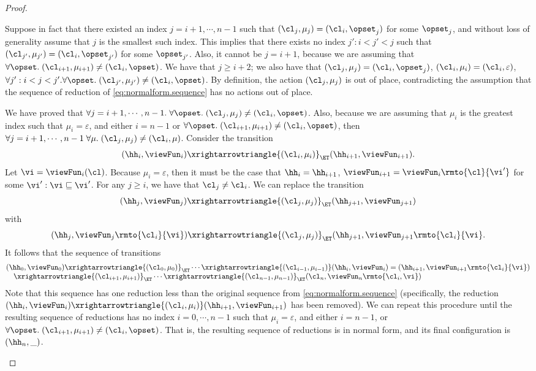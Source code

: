 \begin{proof}
\begin{enumerate}
Suppose in fact that there existed 
an index $j = i+1,\cdots, n-1$ such that $(\cl_{j}, \mu_{j}) = (\cl_{i}, \opset_{j})$ for some 
$\opset_{j}$, and without loss of generality assume that $j$ is the smallest such index. This implies that 
there exists no index $j': i < j' < j$ such that $(\cl_{j'}, \mu_{j'}) = (\cl_{i}, \opset_{j'})$ for some 
$\opset_{j'}$. Also, it cannot be $j = i+1$, because we are assuming that $\forall \opset.\;(\cl_{i+1}, \mu_{i+1}) \neq 
(\cl_{i}, \opset)$.  We have that $j \geq i+2$; we also have that  $(\cl_{j}, \mu_{j}) = (\cl_{i}, \opset_{j})$, 
$(\cl_{i}, \mu_{i}) = (\cl_{i}, \varepsilon)$, $\forall j': i < j < j'.\forall \opset.\; (\cl_{j'}, \mu_{j'}) \neq (\cl_{i}, \opset)$. 
By definition, the action $(\cl_{j}, \mu_{j})$ is out of place, contradicting the assumption that the sequence of 
reduction of \cref{eq:normalform.sequence} has no actions out of place.

We have proved that $\forall j = i+1, \cdots, n-1.\;\forall \opset.\;(\cl_{j}, \mu_{j}) \neq (\cl_{i}, \opset)$. 
Also, because we are assuming that $\mu_{i}$ is the greatest index such that $\mu_{i} = \varepsilon$, 
and either $i= n-1$ or $\forall \opset.\;(\cl_{i+1},\mu_{i+1}) \neq (\cl_{i}, \opset)$, 
then $\forall j=i+1,\cdots, n-1\;\forall \mu.\;(\cl_{j}, \mu_{j}) \neq (\cl_{i}, \mu)$. 
Consider the transition 
\[
(\hh_{i}, \viewFun_{i}) \xrightarrowtriangle{(\cl_{i}, \mu_{i})}_{\ET} (\hh_{i+1}, \viewFun_{i+1}).
\]
Let $\vi = \viewFun_{i}(\cl)$. Because $\mu_{i} = \varepsilon$, then it must be the case that 
$\hh_{i} = \hh_{i+1}$, $\viewFun_{i+1} = \viewFun_{i}\rmto{\cl}{\vi'}$ for some $\vi' : \vi \sqsubseteq \vi'$. 
For any $j \geq i$, we have that $\cl_{j} \neq \cl_{i}$. We can replace the transition 
\[
(\hh_{j}, \viewFun_{j}) \xrightarrowtriangle{(\cl_{j}, \mu_{j})}_{\ET} (\hh_{j+1}, \viewFun_{j+1})
\]
with 
\[
(\hh_{j}, \viewFun_{j}\rmto{\cl_{i}}{\vi}) \xrightarrowtriangle{(\cl_{j}, \mu_{j})}_{\ET} (\hh_{j+1}, \viewFun_{j+1}\rmto{\cl_{i}}{\vi}.
\]
It follows that the sequence of transitions 
\[ 
\begin{array}{@{}l@{}}
(\hh_{0}, \viewFun_{0}) \xrightarrowtriangle{(\cl_{0}, \mu_{0})}_{\ET} \cdots \xrightarrowtriangle{(\cl_{i-1},\mu_{i-1})} 
(\hh_{i}, \viewFun_{i}) = (\hh_{i+1}, \viewFun_{i+1}\rmto{\cl_{i}}{\vi})  \\
\quad \xrightarrowtriangle{(\cl_{i+1}, \mu_{i+1})}_{\ET} \cdots 
\xrightarrowtriangle{(\cl_{n-1}, \mu_{n-1})}_{\ET} (\cl_{n}, \viewFun_{n}\rmto{\cl_{i}, \vi})
\end{array}
\]
Note that this sequence has one reduction less than the original sequence from \eqref{eq:normalform.sequence} (specifically, 
the reduction $(\hh_{i}, \viewFun_{i}) \xrightarrowtriangle{(\cl_{i}, \mu_{i})} (\hh_{i+1}, \viewFun_{i+1})$ has 
been removed). We can repeat this procedure until the resulting sequence of reductions has no index $i=0,\cdots, n-1$ such that  
$\mu_{i} = \varepsilon$, and either $i = n-1$, or 
$\forall \opset.\; (\cl_{i+1}, \mu_{i+1}) \neq (\cl_{i}, \opset)$. That is, the resulting sequence of reductions is in normal form, 
and its final configuration is $(\hh_{n}, \_)$.


\end{enumerate}
\end{proof}
